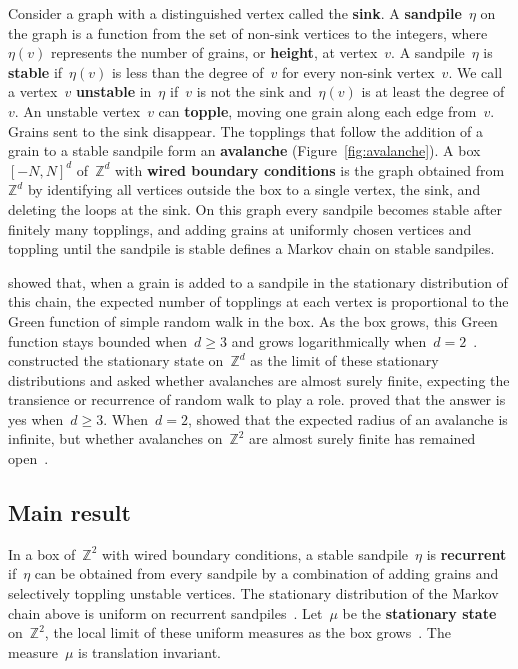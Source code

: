 \documentclass[11pt]{amsart}
\numberwithin{equation}{section}
\newcommand{\Z}{\mathbb Z}
\begin{document}
Consider a graph with a distinguished vertex called the \textbf{sink}. A \textbf{sandpile}~$\eta$ on the graph is a function from the set of non-sink vertices to the integers, where~$\eta(v)$ represents the number of grains, or \textbf{height}, at vertex~$v$. A sandpile~$\eta$ is \textbf{stable} if~$\eta(v)$ is less than the degree of~$v$ for every non-sink vertex~$v$. We call a vertex~$v$ \textbf{unstable} in~$\eta$ if~$v$ is not the sink and~$\eta(v)$ is at least the degree of~$v$. An unstable vertex~$v$ can \textbf{topple}, moving one grain along each edge from~$v$. Grains sent to the sink disappear. The topplings that follow the addition of a grain to a stable sandpile form an \textbf{avalanche} (Figure~\ref{fig:avalanche}). A box~$[-N,N]^d$ of~$\Z^d$ with \textbf{wired boundary conditions} is the graph obtained from~$\Z^d$ by identifying all vertices outside the box to a single vertex, the sink, and deleting the loops at the sink. On this graph every sandpile becomes stable after finitely many topplings, and adding grains at uniformly chosen vertices and toppling until the sandpile is stable defines a Markov chain on stable sandpiles.

\citet{Dhar1990} showed that, when a grain is added to a sandpile in the stationary distribution of this chain, the expected number of topplings at each vertex is proportional to the Green function of simple random walk in the box. As the box grows, this Green function stays bounded when~$d\geq3$ and grows logarithmically when~$d=2$~\citep{LawlerLimic2010}. \citet*{AthreyaJarai2004,AthreyaJarai2006} constructed the stationary state on~$\Z^d$ as the limit of these stationary distributions and asked whether avalanches are almost surely finite, expecting the transience or recurrence of random walk to play a role. \citet*{JaraiRedig2008} proved that the answer is yes when~$d\geq3$. When~$d=2$, \citet*{BhupatirajuHansonJarai2017} showed that the expected radius of an avalanche is infinite, but whether avalanches on~$\Z^2$ are almost surely finite has remained open~\citep*{JaraiRedig2008,JaraiWerning2014,Jarai2018}.


\subsection{Main result}\label{ssec:main-results}

In a box of~$\Z^2$ with wired boundary conditions, a stable sandpile~$\eta$ is \textbf{recurrent} if~$\eta$ can be obtained from every sandpile by a combination of adding grains and selectively toppling unstable vertices. The stationary distribution of the Markov chain above is uniform on recurrent sandpiles~\citep{Dhar1990}. Let~$\mu$ be the \textbf{stationary state} on~$\Z^2$, the local limit of these uniform measures as the box grows~\citep*{AthreyaJarai2004,AthreyaJarai2006}. The measure~$\mu$ is translation invariant.
\end{document}
